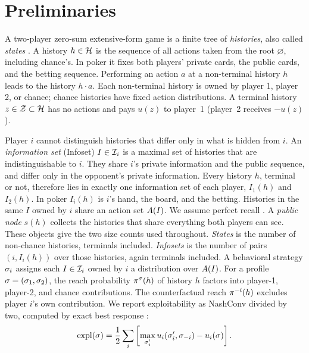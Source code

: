 \section{Preliminaries}
\label{sec:prelim}

A two-player zero-sum extensive-form game is a finite tree of \emph{histories}, also
called \emph{states} \cite{koller1997representations,zinkevich2007regret}. A
history $h \in \mathcal{H}$ is the sequence of all actions taken from the root
$\varnothing$, including chance's. In poker it fixes both players' private cards,
the public cards, and the betting sequence. Performing an action $a$ at a non-terminal
history $h$ leads to the history $h \cdot a$. Each non-terminal history is owned by
player 1, player 2, or chance; chance histories have fixed action distributions. A
terminal history $z \in \mathcal{Z} \subset \mathcal{H}$ has no actions and pays $u(z)$ to
player~1 (player~2 receives $-u(z)$).

Player $i$ cannot distinguish histories that differ only in what is hidden from $i$.
An \emph{information set} (Infoset) $I \in \mathcal{I}_i$ is a maximal set of histories that are
indistinguishable to $i$. They share $i$'s private information and the public
sequence, and differ only in the opponent's private information. Every history $h$,
terminal or not, therefore lies in exactly one information set of each player,
$I_1(h)$ and $I_2(h)$. In poker $I_i(h)$ is $i$'s hand, the board, and the betting. Histories in the same $I$ owned by $i$ share an action set
$A(I)$. We assume perfect recall \cite{zinkevich2007regret}. A \emph{public node} $s(h)$
\cite{burch2014solving,moravvcik2017deepstack} collects the
histories that share everything both players can see. These objects give the two size counts used throughout. \emph{States} is the
number of non-chance histories, terminals included. \emph{Infosets} is the number of
pairs $(i, I_i(h))$ over those histories, again terminals included.
A behavioral strategy $\sigma_i$ assigns each $I \in \mathcal{I}_i$ owned by $i$ a
distribution over $A(I)$. For a profile $\sigma = (\sigma_1, \sigma_2)$, the reach
probability $\pi^{\sigma}(h)$ of history $h$ factors into player-1, player-2, and
chance contributions. The counterfactual reach $\pi^{-i}(h)$ excludes player $i$'s own
contribution. We report exploitability as NashConv \cite{lanctot2019openspiel} divided
by two, computed by exact best response \cite{johanson2011accelerating}:
\begin{equation}
    \mathrm{expl}(\sigma) = \frac{1}{2} \sum_i \left[\max_{\sigma_i'} u_i(\sigma_i', \sigma_{-i}) - u_i(\sigma)\right].
    \label{eq:exploitability}
\end{equation}

